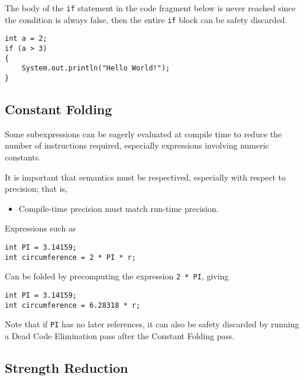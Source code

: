 \begin{example}
    The body of the \texttt{if} statement in the code fragment below is never reached since the condition is always false, then the entire \texttt{if} block can be safety discarded.
    \begin{verbatim}
int a = 2;
if (a > 3)
{
    System.out.println("Hello World!");
}
    \end{verbatim}
\end{example}

\subsection{Constant Folding}

\begin{definition}
    Some subexpressions can be eagerly evaluated at compile time to reduce the number of instructions required, especially expressions involving numeric constants.
    
    It is important that semantics must be respectived, especially with respect to precision; that is,
    \begin{itemize}
        \item Compile-time precision must match run-time precision.
    \end{itemize}
\end{definition}

\begin{example}
    Expressions such as
    \begin{verbatim}
int PI = 3.14159;
int circumference = 2 * PI * r;
    \end{verbatim}
    
    Can be folded by precomputing the expression \texttt{2 * PI}, giving
    \begin{verbatim}
int PI = 3.14159;
int circumference = 6.28318 * r;
    \end{verbatim}
    
    Note that if \texttt{PI} has no later references, it can also be safety discarded by running a Dead Code Elimination pass after the Constant Folding pass.
\end{example}

\subsection{Strength Reduction}

